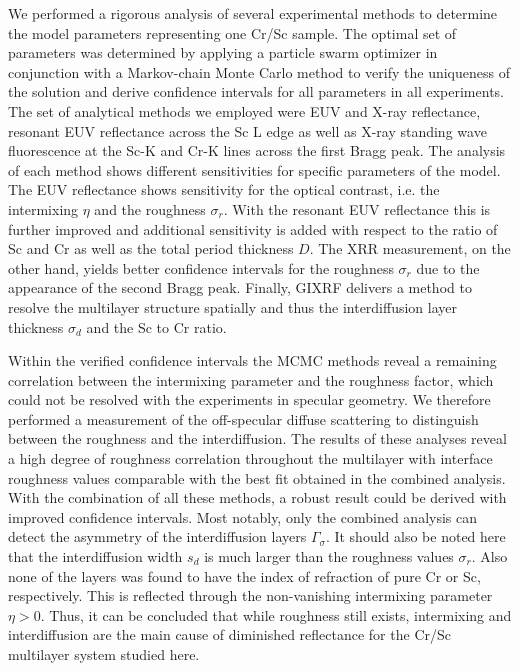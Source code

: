 We performed a rigorous analysis of several experimental methods to determine 
the model parameters representing one Cr/Sc sample. The optimal set of 
parameters was determined by applying a particle swarm optimizer in conjunction 
with a Markov-chain Monte Carlo method to verify the uniqueness of the solution 
and derive confidence intervals for all parameters in all experiments. The set 
of analytical methods we employed were EUV and X-ray reflectance, resonant EUV 
reflectance across the Sc L edge as well as X-ray standing wave fluorescence at 
the Sc-K and Cr-K lines across the first Bragg peak. The analysis of each 
method shows different sensitivities for specific parameters of the model. The 
EUV reflectance shows sensitivity for the optical contrast, i.e. the 
intermixing $\eta$ and the roughness $\sigma_r$. With the resonant EUV 
reflectance this is further improved and additional sensitivity is added with 
respect to the ratio of Sc and Cr as well as the total period thickness $D$. 
The XRR measurement, on the other hand, yields better confidence intervals for 
the roughness $\sigma_r$ due to the appearance of the second Bragg peak.
Finally, GIXRF delivers a method to resolve the 
multilayer structure spatially and thus the interdiffusion layer thickness 
$\sigma_d$ and the Sc to Cr ratio.

Within the verified confidence intervals the MCMC methods reveal a remaining 
correlation between the intermixing parameter and the roughness factor, which 
could not be resolved with the experiments in specular geometry. We therefore 
performed a measurement of the off-specular diffuse scattering to distinguish 
between the roughness and the interdiffusion. The results of these analyses 
reveal a high degree of roughness correlation throughout the multilayer with 
interface roughness values comparable with the best fit obtained in the 
combined analysis. With the combination of all these methods, a robust result 
could be derived with improved confidence intervals. Most notably, only the 
combined analysis can detect the asymmetry of the interdiffusion layers 
$\Gamma_\sigma$. It should also be noted here that the interdiffusion width 
$s_d$ is much larger than the roughness values $\sigma_r$. Also none of the 
layers was found to have the index of refraction of pure Cr or Sc, 
respectively. This is reflected through the non-vanishing intermixing parameter 
$\eta>0$. Thus, it can be concluded that while roughness still exists, 
intermixing and interdiffusion are the main cause of diminished reflectance for 
the Cr/Sc multilayer system studied here.